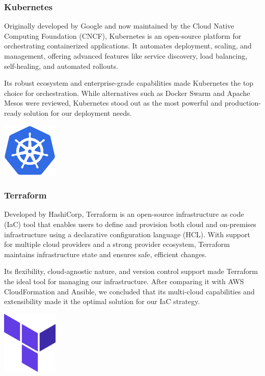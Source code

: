 \subsubsection{Kubernetes}
Originally developed by Google and now maintained by the Cloud Native Computing Foundation (CNCF), Kubernetes is an open-source platform for orchestrating containerized applications. It automates deployment, scaling, and management, offering advanced features like service discovery, load balancing, self-healing, and automated rollouts.\mynewline

Its robust ecosystem and enterprise-grade capabilities made Kubernetes the top choice for orchestration. While alternatives such as Docker Swarm and Apache Mesos were reviewed, Kubernetes stood out as the most powerful and production-ready solution for our deployment needs.

\begin{center}
    \centering
    \includegraphics[width=0.2\textwidth]{Images/Kubernetes Logo.png}
     \cite{kubernetes_logo}
    \label{fig:kubernetes_logo}
\end{center}

\subsubsection{Terraform}
Developed by HashiCorp, Terraform is an open-source infrastructure as code (IaC) tool that enables users to define and provision both cloud and on-premises infrastructure using a declarative configuration language (HCL). With support for multiple cloud providers and a strong provider ecosystem, Terraform maintains infrastructure state and ensures safe, efficient changes.\mynewline

Its flexibility, cloud-agnostic nature, and version control support made Terraform the ideal tool for managing our infrastructure. After comparing it with AWS CloudFormation and Ansible, we concluded that its multi-cloud capabilities and extensibility made it the optimal solution for our IaC strategy.

\begin{center}
    \centering
    \includegraphics[width=0.2\textwidth]{Images/Terraform Logo.png}
     \cite{terraform_logo}
    \label{fig:terraform_logo}
\end{center}

